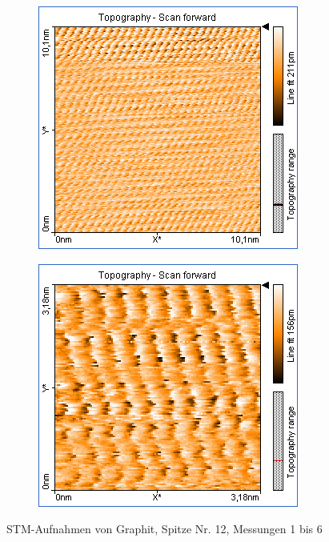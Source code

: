 \begin{figure}
\begin{subfigure}[b]{\picwidth}
        \caption{}
        \label{fig:graphit_06_04}
    \end{subfigure}
    \begin{subfigure}[b]{\picwidth}
        \includegraphics[width=\textwidth]{data/Graphit/pic_06_05_10nm}
        \caption{}
        \label{fig:graphit_06_05}
    \end{subfigure}\qquad
    \begin{subfigure}[b]{\picwidth}
        \includegraphics[width=\textwidth]{data/Graphit/pic_06_06_3nm}
        \caption{}
        \label{fig:graphit_06_06}
    \end{subfigure}
    \caption{STM-Aufnahmen von Graphit, Spitze Nr. 12, Messungen 1 bis 6}\label{fig:graphit_06}
\end{figure}

